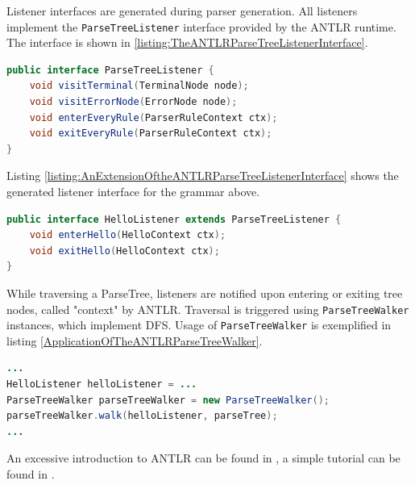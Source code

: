 Listener interfaces are generated during parser generation.
All listeners implement the \texttt{ParseTreeListener} interface provided by the \gls{ANTLR} runtime.
The interface is shown in \ref{listing:TheANTLRParseTreeListenerInterface}.
\begin{lstlisting}[language=Java,caption={The ANTLR ParseTreeListener interface},label={listing:TheANTLRParseTreeListenerInterface}]
public interface ParseTreeListener {
	void visitTerminal(TerminalNode node);
	void visitErrorNode(ErrorNode node);
	void enterEveryRule(ParserRuleContext ctx);
	void exitEveryRule(ParserRuleContext ctx);
}
\end{lstlisting}
Listing \ref{listing:AnExtensionOftheANTLRParseTreeListenerInterface} shows the generated listener interface for the grammar above.
\begin{lstlisting}[language=Java,caption={An extension of the ANTLR ParseTreeListener interface},label={listing:AnExtensionOftheANTLRParseTreeListenerInterface}]
public interface HelloListener extends ParseTreeListener {
    void enterHello(HelloContext ctx);
    void exitHello(HelloContext ctx);
}
\end{lstlisting}
While traversing a \gls{ParseTree}, listeners are notified upon entering or exiting tree nodes, called "context" by \gls{ANTLR}.
Traversal is triggered using \texttt{Parse\-Tree\-Walker} instances, which implement \gls{DFS}.
Usage of \texttt{Parse\-Tree\-Walker} is exemplified in listing \ref{ApplicationOfTheANTLRParseTreeWalker}.
\begin{lstlisting}[language=Java,caption={Application of the ANTLR ParseTreeWalker},label={listing:ApplicationOfTheANTLRParseTreeWalker}]
...
HelloListener helloListener = ...
ParseTreeWalker parseTreeWalker = new ParseTreeWalker();
parseTreeWalker.walk(helloListener, parseTree);
...
\end{lstlisting}

An excessive introduction to \gls{ANTLR} can be found in \cite{Parr:2013:DAR:2501720}, a simple tutorial can be found in \cite{ANTLRv4GettingStarted}.
